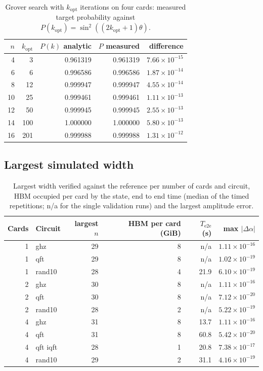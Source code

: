 \documentclass[pdflatex,sn-mathphys-num]{sn-jnl}
\theoremstyle{thmstyleone}
\theoremstyle{thmstylethree}
\begin{document}
\begin{table}[t]
\caption{Grover search with $k_{\mathrm{opt}}$ iterations on four cards: measured target probability against
$P(k_{\mathrm{opt}}) = \sin^2((2k_{\mathrm{opt}}+1)\theta)$.}\label{tab:grover}
\begin{tabular}{@{}rrrrr@{}}
\toprule
$n$ & $k_{\mathrm{opt}}$ & $P(k)$ analytic & $P$ measured & difference \\
\midrule
4 & 3 & 0.961319 & 0.961319 & $7.66\times 10^{-15}$ \\
6 & 6 & 0.996586 & 0.996586 & $1.87\times 10^{-14}$ \\
8 & 12 & 0.999947 & 0.999947 & $4.55\times 10^{-14}$ \\
10 & 25 & 0.999461 & 0.999461 & $1.11\times 10^{-13}$ \\
12 & 50 & 0.999945 & 0.999945 & $2.55\times 10^{-13}$ \\
14 & 100 & 1.000000 & 1.000000 & $5.80\times 10^{-13}$ \\
16 & 201 & 0.999988 & 0.999988 & $1.31\times 10^{-12}$ \\
\bottomrule
\end{tabular}
\end{table}

\subsection{Largest simulated width}\label{subsec:res-maxwidth}

\begin{table}[t]
\caption{Largest width verified against the reference per number of cards and circuit, HBM occupied per card by the
state, end to end time (median of the timed repetitions; n/a for the single validation runs) and the largest amplitude
error.}\label{tab:maxwidth}
\begin{tabular}{@{}rlrrrr@{}}
\toprule
Cards & Circuit & largest $n$ & HBM per card (GiB) & $T_{\mathrm{e2e}}$ (s) & max $|\Delta\alpha|$ \\
\midrule
1 & ghz & 29 & 8 & n/a & $1.11\times 10^{-16}$ \\
1 & qft & 29 & 8 & n/a & $1.02\times 10^{-19}$ \\
1 & rand10 & 28 & 4 & 21.9 & $6.10\times 10^{-19}$ \\
2 & ghz & 30 & 8 & n/a & $1.11\times 10^{-16}$ \\
2 & qft & 30 & 8 & n/a & $7.12\times 10^{-20}$ \\
2 & rand10 & 28 & 2 & n/a & $5.22\times 10^{-19}$ \\
4 & ghz & 31 & 8 & 13.7 & $1.11\times 10^{-16}$ \\
4 & qft & 31 & 8 & 60.8 & $5.42\times 10^{-20}$ \\
4 & qft iqft & 28 & 1 & 20.8 & $7.38\times 10^{-17}$ \\
4 & rand10 & 29 & 2 & 31.1 & $4.16\times 10^{-19}$ \\
\bottomrule
\end{tabular}
\end{table}
\end{document}

